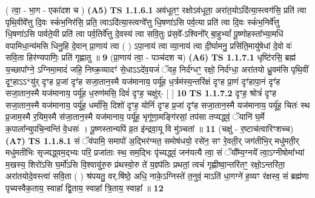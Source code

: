 \documentclass[17pt]{extarticle}
\begin{document}
                  \newline
                      ( त्वा॒ - भा॒ग - एका॑दश च )  \textbf{(A5)} \newline \newline
                                        \textbf{ TS 1.1.6.1} \newline
                  अव॑धूतꣳ॒॒ रक्षोऽव॑धूता॒ अरा॑त॒योऽदि॑त्या॒स्त्वग॑सि॒ प्रति॑ त्वा पृथि॒वीवे᳚त्तु दि॒वः स्कं॑भ॒निर॑सि॒ प्रति॒ त्वाऽदि॑त्या॒स्त्वग्वे᳚त्तु धि॒षणा॑ऽसि पर्व॒त्या प्रति॑ त्वा दि॒वः स्कं॑भ॒निर्वे᳚त्तु धि॒षणा॑ऽसि पार्वते॒यी प्रति॑ त्वा पर्व॒तिर्वे᳚त्तु दे॒वस्य॑ त्वा सवि॒तुः प्र॑स॒वे᳚-ऽश्विनो᳚र् बा॒हुभ्यां᳚ पू॒ष्णोहस्ता᳚भ्या॒मधि॑ वपामिधा॒न्य॑मसि धिनु॒हि दे॒वान् प्रा॒णाय॑ त्वा ( ) ऽपा॒नाय॑ त्वा व्या॒नाय॑ त्वा दी॒र्घामनु॒ प्रसि॑ति॒मायु॑षेधां दे॒वो वः॑ सवि॒ता हिर॑ण्यपाणिः॒ प्रति॑ गृह्णातु ॥ \textbf{  9 } \newline
                  \newline
                      (प्रा॒णाय॑ त्वा॒ - पञ्च॑दश च)  \textbf{(A6)} \newline \newline
                                        \textbf{ TS 1.1.7.1} \newline
                  धृष्टि॑रसि॒ ब्रह्म॑ य॒च्छापा᳚ग्ने॒ ऽग्निमा॒मादं॑ जहि॒ निष्क्र॒व्यादꣳ॑ से॒धाऽऽदे॑व॒यजं॑ ॅवह॒ निर्द॑ग्धꣳ॒॒ रक्षो॒ निर्द॑ग्धा॒ अरा॑तयो ध्रु॒वम॑सि पृथि॒वीं दृꣳ॒॒हाऽऽ*यु॑र् दृꣳह प्र॒जां दृꣳ॑ह सजा॒तान॒स्मै यज॑मानाय॒ पर्यू॑ह ध॒र्त्रम॑स्य॒न्तरि॑क्षं दृꣳह प्रा॒णं दृꣳ॑हापा॒नं दृꣳ॑ह सजा॒तान॒स्मै यज॑मानाय॒ पर्यू॑ह ध॒रुण॑मसि॒ दिवं॑ दृꣳह॒ चक्षु॑र्- [ ] \textbf{  10 } \newline
                  \newline
                                \textbf{ TS 1.1.7.2} \newline
                  दृꣳह॒ श्रोत्रं॑ दृꣳह सजा॒तान॒स्मै यज॑मानाय॒ पर्यू॑ह॒ धर्मा॑सि॒ दिशो॑ दृꣳह॒ योनिं॑ दृꣳह प्र॒जां दृꣳ॑ह सजा॒तान॒स्मै यज॑मानाय॒ पर्यू॑ह॒ चितः॑ स्थ प्र॒जाम॒स्मै र॒यिम॒स्मै स॑जा॒तान॒स्मै यज॑मानाय॒ पर्यू॑ह॒ भृगू॑णा॒मङ्गि॑रसां॒ तप॑सा तप्यद्ध्वं॒ ॅयानि॑ घ॒र्मे क॒पाला᳚न्युपचि॒न्वन्ति॑ वे॒धसः॑ । पू॒ष्णस्तान्यपि॑ व्र॒त इ॑न्द्रवा॒यू वि मु॑ञ्चतां ॥ \textbf{  11} \newline
                  \newline
                      (चक्षु॑ - र॒ष्टाच॑त्वारिꣳशच्च)  \textbf{(A7)} \newline \newline
                                        \textbf{ TS 1.1.8.1} \newline
                  सं ॅव॑पामि॒ समापो॑ अ॒द्भिर॑ग्मत॒ समोष॑धयो॒ रसे॑न॒ सꣳ रे॒वती॒र् जग॑तीभि॒र् मधु॑मती॒र् मधु॑मतीभिः सृज्यद्ध्वम॒द्भ्यः परि॒ प्रजा॑ताः स्थ॒ सम॒द्भिः पृ॑च्यद्ध्वं॒ जन॑यत्यै त्वा॒ सं ॅयौ᳚म्य॒ग्नये᳚ त्वा॒ऽग्नीषोमा᳚भ्यां म॒खस्य॒ शिरो॑ऽसि घ॒र्मो॑ऽसि वि॒श्वायु॑रु॒रु प्र॑थस्वो॒रु ते॑ य॒ज्ञ्प॑तिः प्रथतां॒ त्वचं॑ गृह्णीष्वा॒न्तरि॑तꣳ॒॒ रक्षो॒ऽन्तरि॑ता॒ अरा॑तयोदे॒वस्त्वा॑ सवि॒ता ( ) श्र॑पयतु॒ वर्.षि॑ष्ठे॒ अधि॒ नाके॒ऽग्निस्ते॑ त॒नुवं॒ माऽति॑ धा॒गग्ने॑ ह॒व्यꣳ र॑क्षस्व॒ सं ब्रह्म॑णा पृच्यस्वैक॒ताय॒ स्वाहा᳚ द्वि॒ताय॒ स्वाहा᳚ त्रि॒ताय॒ स्वाहा᳚ ॥ \textbf{  12 } \newline
\end{document}
